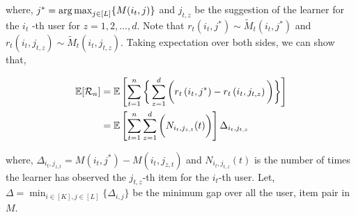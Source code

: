 where, $j^* = \mathop{\rm arg\,max}_{j\in [L]}\lbrace M(i_t,j)\rbrace$ and $j_{t,z}$ be the suggestion of the learner for the $i_t$ -th user for  $z=1,2,\ldots, d$. Note that $r_{t}\left(i_t, j^* \right)\sim \tilde{M}_t\left(i_t, j^*\right)$ and $r_{t}\left(i_t, j_{t,z} \right)\sim \tilde{M}_t\left(i_t, j_{t,z} \right)$. Taking expectation over both sides, we can show that,

\begin{align*}
\mathbb{E}[\mathcal{R}_n] & = \mathbb{E}\left [ \sum_{t=1}^{n}\bigg\lbrace\sum_{z=1}^{d} \bigg( r_{t}\left(i_t, j^* \right) - r_{t}\left( i_t, j_{t,z}\right)\bigg)\bigg\rbrace\right] \\
&= \mathbb{E}\left [ \sum_{t=1}^{n} \sum_{z=1}^{d} \bigg( N_{i_t,j_{z,t}}(t)\bigg) \right ]\Delta_{i_t,j_{t,z}}
\end{align*}

where, $\Delta_{i_t,j_{z,t}} = M(i_t,j^*) - M(i_t,j_{z,t})$ and $N_{i_t,j_{t,z}}(t)$ is the number of times the learner has observed the $j_{t,z}$-th item for the $i_t$-th user. Let, $\Delta = \min_{i\in[K],j\in[L]}\lbrace \Delta_{i,j}\rbrace$ be the minimum gap over all the user, item pair in $M$.
